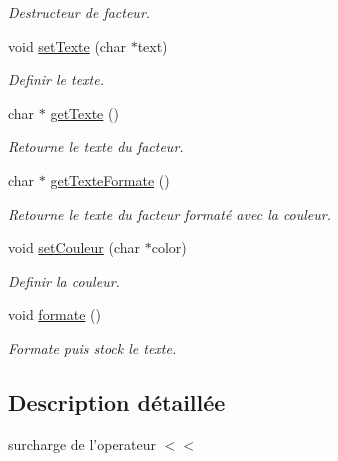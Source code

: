 \begin{DoxyCompactItemize}
\begin{DoxyCompactList}\small\item\em Destructeur de facteur. \item\end{DoxyCompactList}\item 
void \hyperlink{classFacteur_aa83b5bd6563b1f2cab21dddd90fc6666}{setTexte} (char $\ast$text)
\begin{DoxyCompactList}\small\item\em Definir le texte. \item\end{DoxyCompactList}\item 
char $\ast$ \hyperlink{classFacteur_afb04776df3a588d1d52a227854ab37a1}{getTexte} ()
\begin{DoxyCompactList}\small\item\em Retourne le texte du facteur. \item\end{DoxyCompactList}\item 
char $\ast$ \hyperlink{classFacteur_a887bb35c1fdff90040c91716abd15d62}{getTexteFormate} ()
\begin{DoxyCompactList}\small\item\em Retourne le texte du facteur formaté avec la couleur. \item\end{DoxyCompactList}\item 
void \hyperlink{classFacteur_ad17a1b26444aee5f6a474296c47c134a}{setCouleur} (char $\ast$color)
\begin{DoxyCompactList}\small\item\em Definir la couleur. \item\end{DoxyCompactList}\item 
\hypertarget{classFacteur_a16f36a57adf914658c50fbd527f2e2b8}{
void \hyperlink{classFacteur_a16f36a57adf914658c50fbd527f2e2b8}{formate} ()}
\label{classFacteur_a16f36a57adf914658c50fbd527f2e2b8}

\begin{DoxyCompactList}\small\item\em Formate puis stock le texte. \item\end{DoxyCompactList}\end{DoxyCompactItemize}


\subsection{Description détaillée}
surcharge de l'operateur $<$$<$ 

